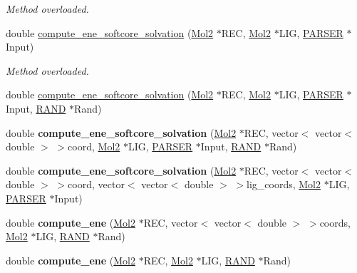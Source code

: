 \begin{DoxyCompactItemize}
\begin{DoxyCompactList}\small\item\em Method overloaded. \item\end{DoxyCompactList}\item 
\hypertarget{classENERGY_aff66abe3b15d2771d04bd03cb82c255a}{
double \hyperlink{classENERGY_aff66abe3b15d2771d04bd03cb82c255a}{compute\_\-ene\_\-softcore\_\-solvation} (\hyperlink{classMol2}{Mol2} $\ast$REC, \hyperlink{classMol2}{Mol2} $\ast$LIG, \hyperlink{classPARSER}{PARSER} $\ast$Input)}
\label{classENERGY_aff66abe3b15d2771d04bd03cb82c255a}

\begin{DoxyCompactList}\small\item\em Method overloaded. \item\end{DoxyCompactList}\item 
double \hyperlink{classENERGY_a40411aebcd70e744cb7f687585f63416}{compute\_\-ene\_\-softcore\_\-solvation} (\hyperlink{classMol2}{Mol2} $\ast$REC, \hyperlink{classMol2}{Mol2} $\ast$LIG, \hyperlink{classPARSER}{PARSER} $\ast$Input, \hyperlink{classRAND}{RAND} $\ast$Rand)
\item 
\hypertarget{classENERGY_aa7fb2d6d0539d054fe1eba2e101e764c}{
double {\bfseries compute\_\-ene\_\-softcore\_\-solvation} (\hyperlink{classMol2}{Mol2} $\ast$REC, vector$<$ vector$<$ double $>$ $>$coord, \hyperlink{classMol2}{Mol2} $\ast$LIG, \hyperlink{classPARSER}{PARSER} $\ast$Input, \hyperlink{classRAND}{RAND} $\ast$Rand)}
\label{classENERGY_aa7fb2d6d0539d054fe1eba2e101e764c}

\item 
\hypertarget{classENERGY_a149328ed6c63073bf4e78a2563bd9dd7}{
double {\bfseries compute\_\-ene\_\-softcore\_\-solvation} (\hyperlink{classMol2}{Mol2} $\ast$REC, vector$<$ vector$<$ double $>$ $>$coord, vector$<$ vector$<$ double $>$ $>$lig\_\-coords, \hyperlink{classMol2}{Mol2} $\ast$LIG, \hyperlink{classPARSER}{PARSER} $\ast$Input)}
\label{classENERGY_a149328ed6c63073bf4e78a2563bd9dd7}

\item 
\hypertarget{classENERGY_a4485b1971d1493f3c259cc2fd652223f}{
double {\bfseries compute\_\-ene} (\hyperlink{classMol2}{Mol2} $\ast$REC, vector$<$ vector$<$ double $>$ $>$coords, \hyperlink{classMol2}{Mol2} $\ast$LIG, \hyperlink{classRAND}{RAND} $\ast$Rand)}
\label{classENERGY_a4485b1971d1493f3c259cc2fd652223f}

\item 
\hypertarget{classENERGY_a37969f398f3831b4ec07a02469e7d242}{
double {\bfseries compute\_\-ene} (\hyperlink{classMol2}{Mol2} $\ast$REC, \hyperlink{classMol2}{Mol2} $\ast$LIG, \hyperlink{classRAND}{RAND} $\ast$Rand)}
\label{classENERGY_a37969f398f3831b4ec07a02469e7d242}


\end{DoxyCompactItemize}
